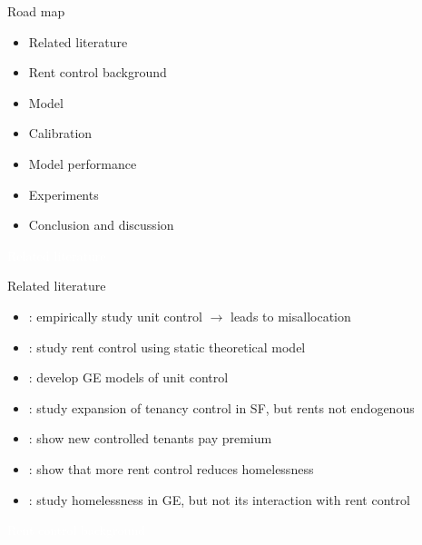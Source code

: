 \documentclass[11pt,aspectratio=169]{beamer}
\begin{document}
\begin{frame}{Road map}

\begin{itemize}
    \item Related literature
    \item Rent control background
    \item Model 
    \item Calibration
    \item Model performance
    \item Experiments
    \item Conclusion and discussion
\end{itemize}

\end{frame}

{
\begin{frame}{}

\centering \Large
\textcolor{white}{Related literature}
    
\end{frame}

}

\begin{frame}{Related literature}{}

\begin{itemize}
    \item \citet{gl-2003}: empirically study unit control $\rightarrow$ leads to misallocation
    \item \citet{fallis-1985}: study rent control using static theoretical model
    \item \citet{eric-1995,fmn-2023}: develop GE models of unit control
    \item \citet{diamond-2019}: study expansion of tenancy control in SF, but rents not endogenous
    \item \citet{nagy-1997,early-2000,chen-etal-2016}: show new controlled tenants pay premium
    \item \citet{eo-1998}: show that more rent control reduces homelessness
    \item \citet{abramson-2024,az-2024}: study homelessness in GE, but not its interaction with rent control
\end{itemize}

\end{frame}

{
\begin{frame}{}

\centering \Large
\textcolor{white}{Rent control background}
    
\end{frame}

}
\end{document}
